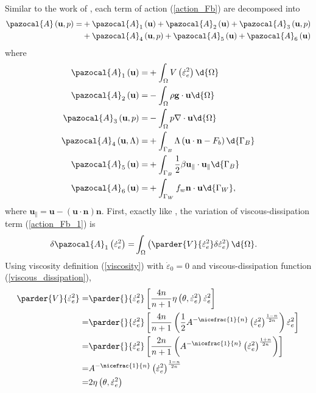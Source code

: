 Similar to the work of \citet{dukowicz_2010}, each term of action (\ref{action_Fb}) are decomposed into
\begin{align}
  \label{action_Fb_parts}
  \pazocal{A} \left(\mathbf{u}, p\right) = &
  + \pazocal{A}_1 \left(\mathbf{u} \right)
  + \pazocal{A}_2 \left(\mathbf{u} \right)
  + \pazocal{A}_3 \left(\mathbf{u}, p \right) \\ &
  + \pazocal{A}_4 \left(\mathbf{u}, p \right) 
  + \pazocal{A}_5 \left(\mathbf{u} \right) 
  + \pazocal{A}_6 \left(\mathbf{u} \right) 
\end{align}
where
\begin{align}
  \label{action_Fb_1}
  \pazocal{A}_1 \left(\mathbf{u} \right) = &+ \int_{\Omega} V\left( \dot{\varepsilon}_e^2 \right) \d{\Omega} \\ 
  \label{action_Fb_2}
  \pazocal{A}_2 \left(\mathbf{u} \right) = &- \int_{\Omega} \rho \mathbf{g} \cdot \mathbf{u} \d{\Omega} \\
  \label{action_Fb_3}
  \pazocal{A}_3 \left(\mathbf{u}, p \right) = &- \int_{\Omega} p \nabla \cdot \mathbf{u} \d{\Omega} \\
  \label{action_Fb_4}
  \pazocal{A}_4 \left(\mathbf{u}, \Lambda \right) = &+ \int_{\Gamma_B} \Lambda \left( \mathbf{u} \cdot \mathbf{n} - F_b \right) \d{\Gamma_B} \\
  \label{action_Fb_5}
  \pazocal{A}_5 \left(\mathbf{u} \right) = &+ \int_{\Gamma_B} \frac{1}{2} \beta \mathbf{u}_{\Vert} \cdot \mathbf{u}_{\Vert} \d{\Gamma_B} \\
  \label{action_Fb_6}
  \pazocal{A}_6 \left(\mathbf{u} \right) = &+ \int_{\Gamma_W} f_w \mathbf{n} \cdot \mathbf{u} \d{\Gamma_W},
\end{align}
where $\mathbf{u}_{\Vert} = \mathbf{u} - \left( \mathbf{u} \cdot \mathbf{n} \right) \mathbf{n}$.
First, exactly like \citet{dukowicz_2010}, the variation of viscous-dissipation term (\ref{action_Fb_1}) is
\begin{align}
  \label{intermediate_action_variation_Fb_1}
  \delta \pazocal{A}_1 \left( \dot{\varepsilon}_e^2 \right) = & \int_{\Omega} \left( \parder{V}{\dot{\varepsilon}_e^2} \delta \dot{\varepsilon}_e^2 \right) \d{\Omega}.
\end{align}
Using viscosity definition (\ref{viscosity}) with $\dot{\varepsilon}_0 = 0$ and viscous-dissipation function (\ref{viscous_dissipation}),
\begin{align*}
  \parder{V}{\dot{\varepsilon}_e^2} =& \parder{}{\dot{\varepsilon}_e^2} \left[ \frac{4n}{n+1} \eta\left(\theta, \dot{\varepsilon}_e^2 \right) \dot{\varepsilon}_e^2 \right] \\
  =& \parder{}{\dot{\varepsilon}_e^2} \left[ \frac{4n}{n+1} \left( \frac{1}{2} A^{-\nicefrac{1}{n}} \left( \dot{\varepsilon}_e^2 \right)^{\frac{1-n}{2n}} \right) \dot{\varepsilon}_e^2 \right] \\
  =& \parder{}{\dot{\varepsilon}_e^2} \left[ \frac{2n}{n+1} \left( A^{-\nicefrac{1}{n}} \left( \dot{\varepsilon}_e^2 \right)^{\frac{1+n}{2n}} \right) \right] \\
  =& A^{-\nicefrac{1}{n}} \left( \dot{\varepsilon}_e^2 \right)^{\frac{1-n}{2n}} \\
  =& 2 \eta \left( \theta, \dot{\varepsilon}_e^2 \right)
\end{align*}
